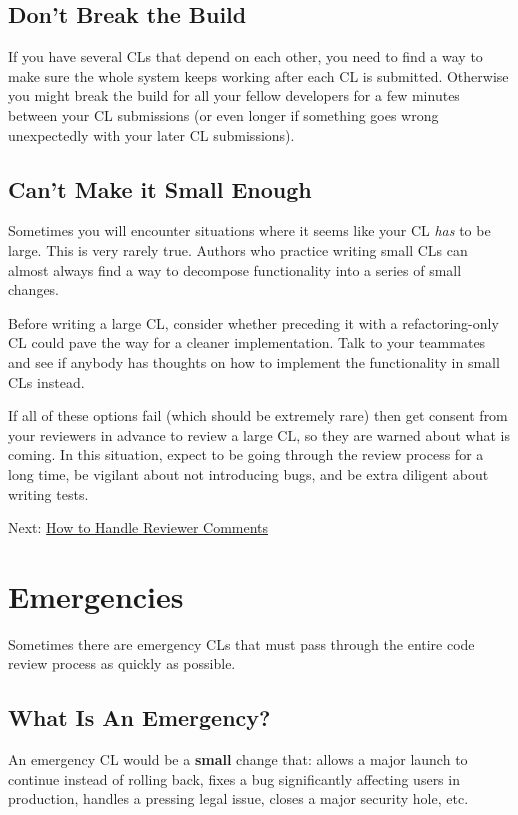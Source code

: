 \documentclass[
]{article}
\begin{document}
\subsection{Don't Break the Build}\label{break}

If you have several CLs that depend on each other, you need to find a
way to make sure the whole system keeps working after each CL is
submitted. Otherwise you might break the build for all your fellow
developers for a few minutes between your CL submissions (or even longer
if something goes wrong unexpectedly with your later CL submissions).

\subsection{Can't Make it Small Enough}\label{cant}

Sometimes you will encounter situations where it seems like your CL
\emph{has} to be large. This is very rarely true. Authors who practice
writing small CLs can almost always find a way to decompose
functionality into a series of small changes.

Before writing a large CL, consider whether preceding it with a
refactoring-only CL could pave the way for a cleaner implementation.
Talk to your teammates and see if anybody has thoughts on how to
implement the functionality in small CLs instead.

If all of these options fail (which should be extremely rare) then get
consent from your reviewers in advance to review a large CL, so they are
warned about what is coming. In this situation, expect to be going
through the review process for a long time, be vigilant about not
introducing bugs, and be extra diligent about writing tests.

Next: \href{handling-comments.md}{How to Handle Reviewer Comments}

\section{Emergencies}\label{emergencies}

Sometimes there are emergency CLs that must pass through the entire code
review process as quickly as possible.

\subsection{What Is An Emergency?}\label{what}

An emergency CL would be a \textbf{small} change that: allows a major
launch to continue instead of rolling back, fixes a bug significantly
affecting users in production, handles a pressing legal issue, closes a
major security hole, etc.
\end{document}
